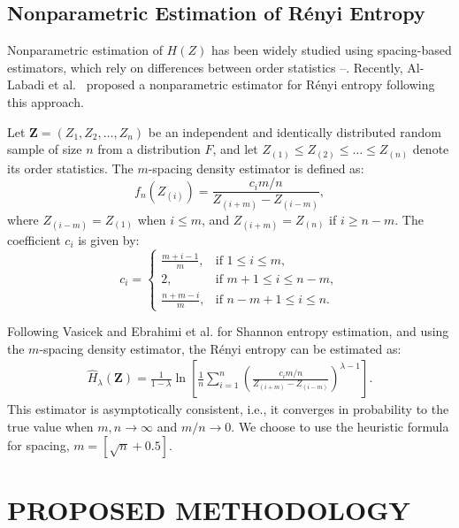 \documentclass[
  journal,
]{IEEEtran}%
\begin{document}
\subsection{Nonparametric Estimation of Rényi
Entropy}\label{nonparametric-estimation-of-ruxe9nyi-entropy}

Nonparametric estimation of \(H(Z)\) has been widely studied using
spacing-based estimators, which rely on differences between order
statistics
--.
Recently, Al-Labadi et al.~
proposed a nonparametric estimator for Rényi entropy following this
approach.

Let \(\bm{Z}=(Z_1, Z_2,\ldots,Z_n)\) be an independent and identically
distributed random sample of size \(n\) from a distribution \(F\), and
let \(Z_{(1)} \leq Z_{(2)} \leq \dots \leq Z_{(n)}\) denote its order
statistics. The \(m\)-spacing density estimator is defined as: \[
f_n(Z_{(i)}) = \frac{c_i m / n}{Z_{(i+m)} - Z_{(i-m)}},
\] where \(Z_{(i-m)} = Z_{(1)}\) when \(i \leq m\), and
\(Z_{(i+m)} = Z_{(n)}\) if \(i \geq n - m\). The coefficient \(c_i\) is
given by: \[
c_i = 
\begin{cases}
\frac{m + i - 1}{m}, & \text{if } 1 \leq i \leq m, \\%
2, & \text{if } m+1 \leq i \leq n - m, \\%
\frac{n + m - i}{m}, & \text{if } n - m + 1 \leq i \leq n.
\end{cases}
\]

Following Vasicek  and Ebrahimi
et al.  for Shannon entropy
estimation, and using the \(m\)-spacing density estimator, the Rényi
entropy can be estimated as: \begin{align}
\label{eq:est_R}
\widehat{H}_\lambda(\bm{Z}) = \frac{1}{1 - \lambda} \ln \left[\frac{1}{n} \sum_{i=1}^{n} \left( \frac{c_i m / n}{Z_{(i+m)} - Z_{(i-m)}} \right)^{\lambda - 1} \right].
\end{align} This estimator is asymptotically consistent, i.e., it
converges in probability to the true value when \(m,n\rightarrow\infty\)
and \(m/n\rightarrow0\). We choose to use the heuristic formula for
spacing, \(m=\left[\sqrt{n}+0.5\right]\).

\section{PROPOSED METHODOLOGY}\label{sec:met}
\end{document}
